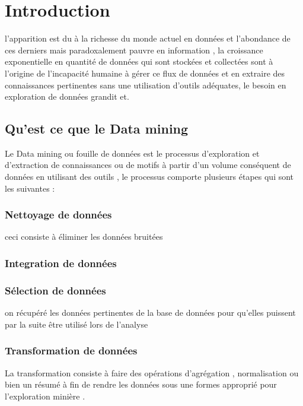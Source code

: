 \documentclass[12pt,a4paper,oneside]{book}
\begin{document}
\def\reportnumber{1}
%
    \chapter{Introduction}
    l'apparition est du  à la richesse du monde actuel en données et l'abondance  de ces derniers  mais paradoxalement pauvre  en information ,  la croissance exponentielle en quantité de données qui sont stockées et collectées sont à l'origine de l'incapacité humaine à gérer ce flux  de données et en extraire des connaissances pertinentes sans une utilisation d'outils adéquates, le besoin en exploration de données grandit et.
    
    \section{Qu'est ce que le Data mining}
    Le Data mining ou fouille de données est le processus d'exploration et d'extraction de connaissances ou de motifs à partir d'un volume conséquent de données en utilisant des outils ,
    le processus comporte plusieurs étapes qui sont les suivantes :
    \subsection{Nettoyage de données}
    ceci consiste à éliminer les données bruitées 
    \subsection{Integration de données}
    
    \subsection{Sélection de données}
    on récupéré les données pertinentes de la base de données pour qu'elles puissent
		par la suite être utilisé lors de l'analyse
	\subsection{Transformation de données}
	La transformation consiste à faire des opérations d'agrégation , normalisation ou bien un résumé à fin de rendre les données sous une formes approprié  pour l'exploration minière .  
\end{document}

